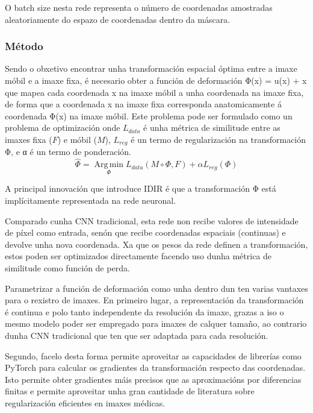 O batch size nesta rede representa o número de coordenadas amostradas aleatoriamente do espazo de coordenadas dentro da máscara.

\subsubsection{Método}
\label{subsubsec:Método}

Sendo o obxetivo encontrar unha transformación espacial óptima entre a imaxe móbil e a imaxe fixa,
é necesario obter a función de deformación  Φ(x) = u(x) + x que mapea cada coordenada x na imaxe móbil a unha coordenada na imaxe fixa, 
de forma que a coordenada x na imaxe fixa corresponda anatomicamente á coordenada Φ(x) na imaxe móbil.
Este problema pode ser formulado como un problema de optimización onde $L_{data}$ é unha métrica de similitude entre as imaxes fixa ($F$) e móbil ($M$), $L_{reg}$ é un termo de regularización na transformación Φ, e α é un termo de ponderación.
\begin{equation}
    \hat{\Phi} = \operatorname*{Arg\,min}_{\Phi} L_{data}(M \circ \Phi, F) + \alpha L_{reg}(\Phi)
\end{equation}


A principal innovación que introduce IDIR\cite{wolterink2021implicit} é que a transformación Φ está implícitamente representada na rede neuronal.

Comparado cunha CNN tradicional, esta rede non recibe valores de intensidade de píxel como entrada,
senón que recibe coordenadas espaciais (continuas) e devolve unha nova coordenada.
Xa que os pesos da rede definen a transformación, estos poden ser optimizados directamente 
facendo uso dunha métrica de similitude como función de perda.

Parametrizar a función de deformación como unha  dentro dun  ten varias vantaxes para o rexistro de imaxes.
En primeiro lugar, a representación da transformación é continua e polo tanto independente da resolución da imaxe, 
grazas a iso o mesmo modelo poder ser empregado para imaxes de calquer tamaño, ao contrario dunha CNN tradicional 
que ten que ser adaptada para cada resolución.

Segundo, facelo desta forma permite aproveitar as capacidades de librerías como PyTorch para calcular os gradientes da transformación respecto das coordenadas.
Isto permite obter gradientes máis precisos que as aproximacións por diferencias finitas 
e permite aproveitar unha gran cantidade de literatura sobre regularización eficientes en imaxes médicas.

